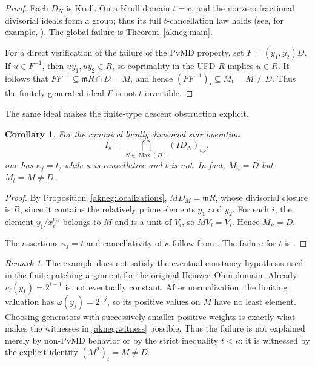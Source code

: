 \documentclass[11pt]{amsart}
\newtheorem{corollary}[corollary]{Corollary}
\theoremstyle{definition}
\theoremstyle{remark}
\newtheorem{remark}[remark]{Remark}
\newcommand{\PvMD}{\mathrm{PvMD}}
\newcommand{\Max}{\operatorname{Max}}
\newcommand{\m}{\mathfrak m}
\begin{document}
\begin{proof}
Each $D_N$ is Krull.  On a Krull domain $t=v$, and the nonzero fractional
divisorial ideals form a group; thus its full $t$-cancellation law holds
(see, for example, \cite{GilmerBook}).  The global failure is
Theorem~\ref{akneg:main}.

For a direct verification of the failure of the $\PvMD$ property, set
$F=(y_1,y_2)D$.  If $u\in F^{-1}$, then $uy_1,uy_2\in R$, so coprimality
in the UFD $R$ implies $u\in R$.  It follows that
$FF^{-1}\subseteq\m R\cap D=M$, and hence
$(FF^{-1})_t\subseteq M_t=M\ne D$.  Thus the finitely generated ideal
$F$ is not $t$-invertible.
\end{proof}

The same ideal makes the finite-type descent obstruction explicit.

\begin{corollary}\label{akneg:kappa}
For the canonical locally divisorial star operation
\[
 I_\kappa=\bigcap_{N\in\Max(D)}(ID_N)_{v_N},
\]
one has $\kappa_f=t$, while $\kappa$ is cancellative and $t$ is not.
In fact, $M_\kappa=D$ but $M_t=M\ne D$.
\end{corollary}

\begin{proof}
By Proposition~\ref{akneg:localizations}, $MD_M=\m R$, whose divisorial
closure is $R$, since it contains the relatively prime elements $y_1$
and $y_2$.  For each $i$, the element $y_1/x_i^{e_{i1}}$ belongs to $M$
and is a unit of $V_i$, so $MV_i=V_i$.  Hence $M_\kappa=D$.

The assertions $\kappa_f=t$ and cancellativity of $\kappa$ follow from
.  The failure for $t$ is .
\end{proof}

\begin{remark}\label{akneg:mechanism}
The example does not satisfy the eventual-constancy hypothesis used in the
finite-patching argument for the original Heinzer--Ohm domain.  Already
$v_i(y_1)=2^{i-1}$ is not eventually constant.  After normalization, the
limiting valuation has $\omega(y_j)=2^{-j}$, so its positive values on
$M$ have no least element.  Choosing generators with successively smaller
positive weights is exactly what makes the witnesses in
\eqref{akneg:witness} possible.  Thus the failure is not explained merely
by non-$\PvMD$ behavior or by the strict inequality $t<\kappa$: it is
witnessed by the explicit identity $(M^2)_t=M\ne D$.
\end{remark}
\end{document}
